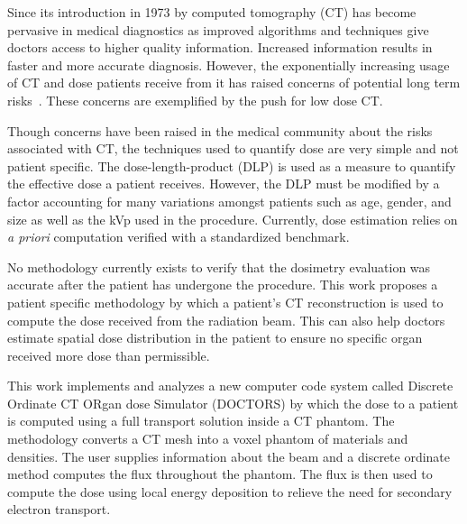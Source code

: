 

Since its introduction in 1973 by \citet{ref:hounsfieldg} computed tomography (CT) has become pervasive in medical diagnostics as improved algorithms and techniques give doctors access to higher quality information. Increased information results in faster and more accurate diagnosis. However, the exponentially increasing usage of CT and dose patients receive from it has raised concerns of potential long term risks~\citep{ref:brennerd,ref:einsteina1,ref:abramsh,ref:einsteina2,ref:mccolloughc,ref:yul}. These concerns are exemplified by the push for low dose CT.


Though concerns have been raised in the medical community about the risks associated with CT, the techniques used to quantify dose are very simple and not patient specific. The dose-length-product (DLP) is used as a measure to quantify the effective dose a patient receives. However, the DLP must be modified by a factor accounting for many variations amongst patients such as age, gender, and size as well as the kVp used in the procedure. Currently, dose estimation relies on \textit{a priori} computation verified with a standardized benchmark. 

No methodology currently exists to verify that the dosimetry evaluation was accurate after the patient has undergone the procedure. This work proposes a patient specific methodology by which a patient's CT reconstruction is used to compute the dose received from the radiation beam. This can also help doctors estimate spatial dose distribution in the patient to ensure no specific organ received more dose than permissible.

This work implements and analyzes a new computer code system called Discrete Ordinate CT ORgan dose Simulator (DOCTORS) by which the dose to a patient is computed using a full transport solution inside a CT phantom. The methodology converts a CT mesh into a voxel phantom of materials and densities. The user supplies information about the beam and a discrete ordinate method computes the flux throughout the phantom. The flux is then used to compute the dose using local energy deposition to relieve the need for secondary electron transport.

